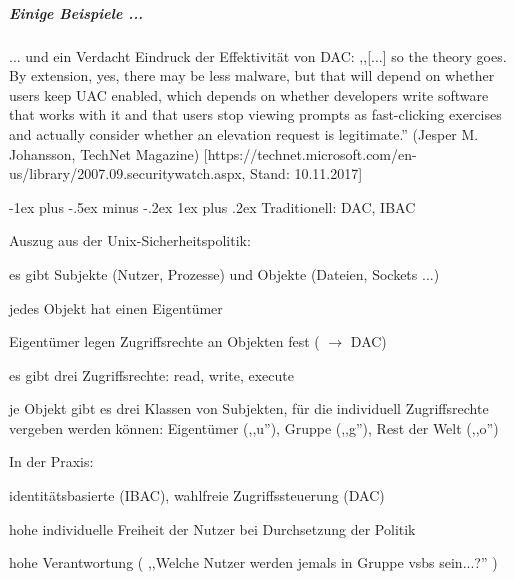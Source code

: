 \documentclass[a4paper]{article}
\makeatletter
\renewcommand{\subsubsection}{\@startsection{subsubsection}{3}{0mm}%
 {-1ex plus -.5ex minus -.2ex}%
 {1ex plus .2ex}%
 {\normalfont\small\bfseries}}
\makeatother
\begin{document}
\begin{multicols}{3}
    \subparagraph{Einige Beispiele ...}


    ... und ein Verdacht Eindruck der Effektivität von DAC: ,,[...] so
    the theory goes. By extension, yes, there may be less malware, but that
    will depend on whether users keep UAC enabled, which depends on whether
    developers write software that works with it and that users stop viewing
    prompts as fast-clicking exercises and actually consider whether an
    elevation request is legitimate.'' (Jesper M. Johansson, TechNet
    Magazine)
    [https://technet.microsoft.com/en-us/library/2007.09.securitywatch.aspx,
            Stand: 10.11.2017]


    \subsubsection{Traditionell: DAC, IBAC}

    Auszug aus der Unix-Sicherheitspolitik:

    \begin{itemize*}
        \item
        es gibt Subjekte (Nutzer, Prozesse) und Objekte (Dateien, Sockets ...)
        \item
        jedes Objekt hat einen Eigentümer
        \item
        Eigentümer legen Zugriffsrechte an Objekten fest
        ( $\rightarrow$ DAC)
        \item
        es gibt drei Zugriffsrechte: read, write, execute
        \item
        je Objekt gibt es drei Klassen von Subjekten, für die individuell
        Zugriffsrechte vergeben werden können: Eigentümer (,,u''), Gruppe
        (,,g''), Rest der Welt (,,o'')
    \end{itemize*}

    In der Praxis:

    \begin{itemize*}
        \item
        identitätsbasierte (IBAC), wahlfreie Zugriffssteuerung (DAC)
        \item
        hohe individuelle Freiheit der Nutzer bei Durchsetzung der Politik
        \item
        hohe Verantwortung ( ,,Welche Nutzer werden jemals in Gruppe vsbs
        sein...?'' )
    \end{itemize*}


\end{multicols}
\end{document}
